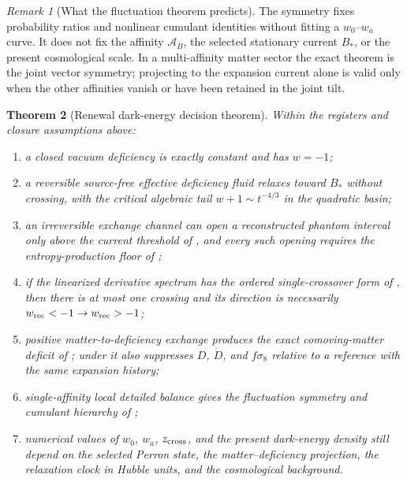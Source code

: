 \documentclass[11pt]{article}
\newtheorem{theorem}{Theorem}[section]
\theoremstyle{definition}
\theoremstyle{remark}
\newtheorem{remark}[theorem]{Remark}
\begin{document}
\begin{remark}[What the fluctuation theorem predicts]
\label{rem:gc-scope}
The symmetry fixes probability ratios and nonlinear cumulant identities without
fitting a \(w_0\)--\(w_a\) curve.  It does not fix the affinity
\(\mathcal A_B\), the selected stationary current \(B_*\), or the present
cosmological scale.  In a multi-affinity matter sector the exact theorem is the
joint vector symmetry; projecting to the expansion current alone is valid only
when the other affinities vanish or have been retained in the joint tilt.
\end{remark}

\begin{theorem}[Renewal dark-energy decision theorem]
\label{thm:renewal-dark-energy-dichotomy}
Within the registers and closure assumptions above:
\begin{enumerate}[label=\textup{(\roman*)},leftmargin=2.6em]
\item a closed vacuum deficiency is exactly constant and has \(w=-1\);
\item a reversible source-free effective deficiency fluid relaxes toward \(B_*\)
      without crossing, with the critical algebraic tail
      \(w+1\sim t^{-4/3}\) in the quadratic basin;
\item an irreversible exchange channel can open a reconstructed phantom interval
      only above the current threshold of
      , and every such opening requires
      the entropy-production floor of ;
\item if the linearized derivative spectrum has the ordered single-crossover
      form of , then there is at most one
      crossing and its direction is necessarily
      \(w_{\rm rec}<-1\to w_{\rm rec}>-1\);
\item positive matter-to-deficiency exchange produces the exact comoving-matter
      deficit of ; under
       it also suppresses \(D\), \(\dot D\), and
      \(f\sigma_8\) relative to a reference with the same expansion history;
\item single-affinity local detailed balance gives the fluctuation symmetry and
      cumulant hierarchy of
      ;
\item numerical values of \(w_0\), \(w_a\), \(z_{\rm cross}\), and the present
      dark-energy density still depend on the selected Perron state, the
      matter--deficiency projection, the relaxation clock in Hubble units, and
      the cosmological background.
\end{enumerate}
\end{theorem}
\end{document}
